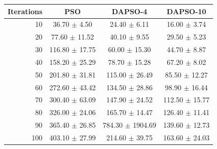 \begin{tabular}{rccc}
\hline
Iterations & PSO & DAPSO-4 & DAPSO-10 \\
\hline
10 & 36.70 $\pm$ 4.50 & 24.40 $\pm$ 6.11 & 16.00 $\pm$ 3.74 \\
20 & 77.60 $\pm$ 11.52 & 40.10 $\pm$ 9.55 & 29.50 $\pm$ 5.23 \\
30 & 116.80 $\pm$ 17.75 & 60.00 $\pm$ 15.30 & 44.70 $\pm$ 8.87 \\
40 & 158.20 $\pm$ 25.29 & 78.70 $\pm$ 15.28 & 67.20 $\pm$ 8.02 \\
50 & 201.80 $\pm$ 31.81 & 115.00 $\pm$ 26.49 & 85.50 $\pm$ 12.27 \\
60 & 272.60 $\pm$ 43.42 & 134.50 $\pm$ 28.86 & 98.90 $\pm$ 16.44 \\
70 & 300.40 $\pm$ 63.09 & 147.90 $\pm$ 24.52 & 112.50 $\pm$ 15.77 \\
80 & 326.00 $\pm$ 24.06 & 165.70 $\pm$ 14.47 & 126.40 $\pm$ 11.41 \\
90 & 365.40 $\pm$ 26.85 & 784.30 $\pm$ 1904.69 & 139.60 $\pm$ 12.73 \\
100 & 403.10 $\pm$ 27.99 & 214.60 $\pm$ 39.75 & 163.60 $\pm$ 24.03 \\
\hline
\end{tabular}